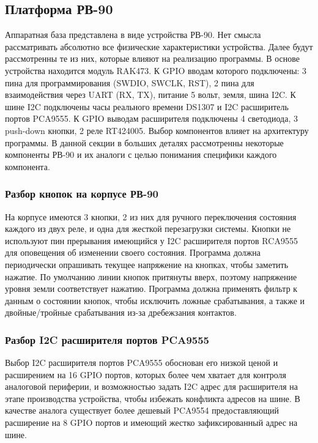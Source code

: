


\newpage
\subsection{ Платформа РВ-90 }
Аппаратная база представлена в виде устройства РВ-90. Нет смысла рассматривать абсолютно все физические характеристики устройства. Далее будут рассмотренны те из них, которые влияют на реализацию программы. В основе устройства находится модуль RAK473. К GPIO вводам которого подключены: 3 пина для программирования (SWDIO, SWCLK, RST), 2 пина для взаимодействия через UART (RX, TX), питание 5 вольт, земля, шина I2C. К шине I2C подключены часы реального времени DS1307 и I2C расширитель портов PCA9555. К GPIO выводам расширителя подключены 4 светодиода, 3 push-down кнопки, 2 реле RT424005.
Выбор компонентов влияет на архитектуру программы. В данной секции в больших деталях рассмотренны некоторые компоненты РВ-90 и их аналоги с целью понимания специфики каждого компонента. 

\subsubsection{ Разбор кнопок на корпусе РВ-90 }
На корпусе имеются 3 кнопки, 2 из них для ручного переключения состояния каждого из двух реле, и одна для жесткой перезагрузки системы.
Кнопки не используют пин прерывания имеющийся у I2C расширителя портов RCA9555 для оповещения об изменении своего состояния. Программа должна периодически опрашивать текущее напряжение на кнопках, чтобы заметить нажатие. По умолчанию линии кнопок притянуты вверх, поэтому напряжение уровня земли соответствует нажатию. Программа должна применять фильтр к данным о состоянии кнопок, чтобы исключить ложные срабатывания, а также и двойные/тройные срабатывания из-за дребежзания контактов. 

\subsubsection{ Разбор I2C расширителя портов PCA9555 } 
Выбор I2C расширителя портов PCA9555 обоснован его низкой ценой и расширением на 16 GPIO портов, которых более чем хватает для контроля аналоговой периферии, и возможностью задать I2C адрес для расширителя на этапе производства устройства, чтобы избежать конфликта адресов на шине. В качестве аналога существует более дешевый PCA9554 предоставляющий расширение на 8 GPIO портов и имеющий жестко зафиксированный адрес на шине. 

